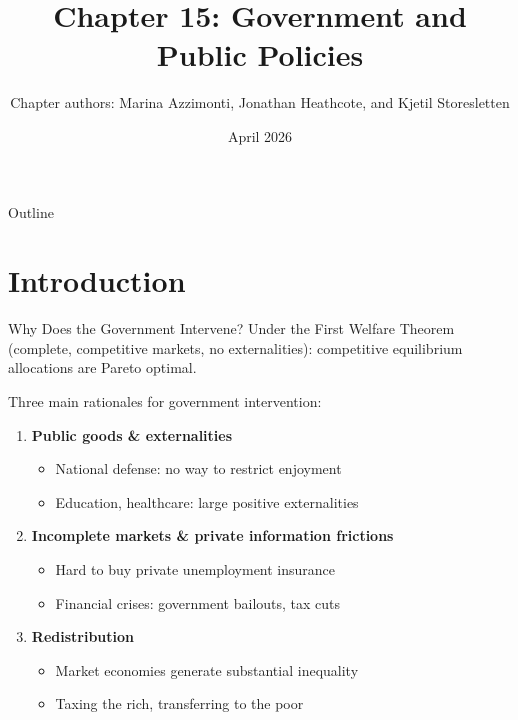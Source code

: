 \documentclass[blue]{beamer}
\title[Ch.\ 15: Government \& Public Policy]{Chapter 15: Government and Public Policies}
\author[Azzimonti, Heathcote \& Storesletten]{Chapter authors: Marina Azzimonti, Jonathan Heathcote, and Kjetil Storesletten}
\date[April 2026]{April 2026}
\begin{document}
  \frame
  {
    \titlepage
  }


\begin{frame}{Outline}
	\vspace{10pt}
	\tableofcontents
\end{frame}



\section{Introduction}

\begin{frame}{Why Does the Government Intervene?}
	Under the First Welfare Theorem (complete, competitive markets, no externalities): competitive equilibrium allocations are Pareto optimal.
	
	\bigskip
	Three main rationales for government intervention:
	\begin{enumerate}
		\item \textbf{Public goods \& externalities}
		\begin{itemize}
			\item National defense: no way to restrict enjoyment
			\item Education, healthcare: large positive externalities 
		\end{itemize}
		\item \textbf{Incomplete markets \& private information frictions}
		\begin{itemize}
			\item Hard to buy private unemployment insurance
			\item Financial crises: government bailouts, tax cuts
		\end{itemize}
		\item \textbf{Redistribution}
		\begin{itemize}
			\item Market economies generate substantial inequality
			\item Taxing the rich, transferring to the poor
		\end{itemize}
	\end{enumerate}
\end{frame}
\end{document}
